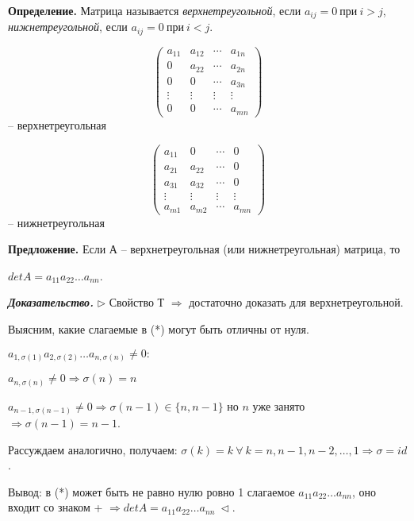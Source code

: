 \bigskip
\textbf{Определение.} Матрица называется \textit{верхнетреугольной}, если $a_{ij} = 0 \ при \ i > j$, \textit{нижнетреугольной}, если $a_{ij} = 0 \ при \ i < j$. 

\begin{equation*}\begin{pmatrix}
		a_{11} & a_{12} & \cdots & a_{1n} \\
		0 & a_{22} & \cdots & a_{2n} \\
        0 & 0 & \cdots & a_{3n} \\
       \vdots & \vdots & \vdots& \vdots \\ 
       0 & 0 & \cdots & a_{mn}
	\end{pmatrix}
\end{equation*} -- верхнетреугольная 

\begin{equation*}\begin{pmatrix}
		a_{11} & 0 & \cdots & 0 \\
		a_{21} & a_{22} & \cdots & 0 \\
        a_{31} & a_{32} & \cdots & 0 \\
       \vdots & \vdots & \vdots& \vdots \\ 
       a_{m1} & a_{m2} & \cdots & a_{mn}
	\end{pmatrix}
\end{equation*} -- нижнетреугольная 

\bigskip
\textbf{Предложение.} Если А -- верхнетреугольная (или нижнетреугольная) матрица, то 

$detA = a_{11} a_{22} \dots a_{nn}$.

\bigskip
\textbf{\textit{Доказательство.}} $\rhd$ Свойство Т $\Rightarrow$ достаточно доказать для верхнетреугольной.

Выясним, какие слагаемые в (*) могут быть отличны от нуля.

$a_{1, \sigma(1)} a_{2, \sigma(2)} \dots a_{n, \sigma(n)} \neq 0:$

$a_{n, \sigma(n)} \neq 0 \Rightarrow \sigma (n) = n$

$a_{n-1, \sigma(n - 1)} \neq 0 \Rightarrow \sigma (n - 1) \in \{n, n - 1 \}$ но $n$ уже занято $\Rightarrow \sigma (n - 1) = n - 1$.

Рассуждаем аналогично, получаем: $\sigma (k) = k \ \forall \ k = n, n-1, n-2, \dots, 1 \Rightarrow \sigma = id$.

Вывод: в (*) может быть не равно нулю ровно 1 слагаемое $a_{11} a_{22} \dots a_{nn}$, оно входит со знаком + $\Rightarrow detA  = a_{11} a_{22} \dots a_{nn} \ \lhd$.

